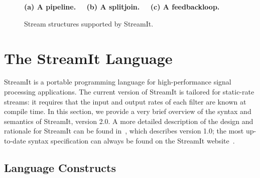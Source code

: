 \begin{figure}[t]
\begin{center}
\begin{minipage}{0.46in}
\centering
{} \\
\end{minipage} 
~
\begin{minipage}{1.3in}
\centering
{} \\
\end{minipage}
~
\begin{minipage}{1.02in}
\centering
{} \\
\end{minipage} 
\\ ~ \\ {\bf \protect\small (a) A pipeline. ~~(b) A splitjoin. ~~(c) A feedbackloop.}
\caption{\protect\small Stream structures supported by StreamIt.
\protect\label{fig:structures}}
\end{center}
\end{figure}

\section{The StreamIt Language}
\label{sec:streamit}

StreamIt is a portable programming language for high-performance
signal processing applications.  The current version of StreamIt is
tailored for static-rate streams: it requires that the input and
output rates of each filter are known at compile time.  In this
section, we provide a very brief overview of the syntax and semantics
of StreamIt, version 2.0.  A more detailed description of the design
and rationale for StreamIt can be found in~\cite{streamitcc}, which
describes version 1.0; the most up-to-date syntax specification can
always be found on the StreamIt website~\cite{streamitweb}.

\subsection{Language Constructs}

